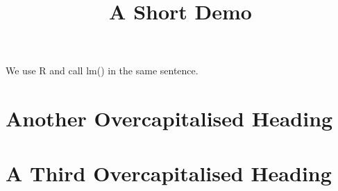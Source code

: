 \documentclass[article]{jss}
\title{A Short Demo}
\begin{document}
We use R and call lm() in the same sentence.
\section{Another Overcapitalised Heading}
\section{A Third Overcapitalised Heading}
\end{document}
